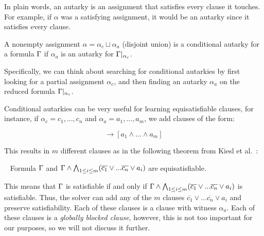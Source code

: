 In plain words, an autarky is an assignment that satisfies every clause it touches. For example, if $\alpha$ was a satisfying assignment, it would be an autarky since it satisfies every clause.

\begin{definition}
    A nonempty assignment $\alpha = \alpha_c \sqcup \alpha_a$ (disjoint union) is a conditional autarky for a formula $\Gamma$ if $\alpha_a$ is an autarky for $\Gamma|_{\alpha_c}$.
\end{definition}

Specifically, we can think about searching for conditional autarkies by first looking for a partial assignment $\alpha_c$, and then finding an autarky $\alpha_a$ on the reduced formula $\Gamma|_{\alpha_c}$.

Conditional autarkies can be very useful for learning equisatisfiable clauses, for instance, if $\alpha_c = c_1, ..., c_n$ and $\alpha_a = a_1, ..., a_m$, we add clauses of the form:

\begin{equation*}
    [c_1 \land ... \land c_n] \rightarrow [a_1 \land ... \land a_m]
\end{equation*}

This results in $m$ different clauses as in the following theorem from Kiesl et al.~\cite{conditionalautarkies}:

\begin{theorem}~\label{thm:gbcequisat}
    Formula $\Gamma$ and $\Gamma \land \bigwedge_{1 \leq i \leq m} (\overline{c_1} \lor ... \overline{c_n} \lor a_i)$ are equisatisfiable.
\end{theorem}

This means that $\Gamma$ is satisfiable if and only if $\Gamma \land \bigwedge_{1 \leq i \leq m} (\overline{c_1} \lor ... \overline{c_n} \lor a_i)$ is satisfiable. Thus, the solver can add any of the $m$ clauses $\overline{c_1} \lor ... \overline{c_n} \lor a_i$ and preserve satisfiability. Each of these clauses is a \pr clause with witness $\alpha_a$. Each of these clauses is a \emph{globally blocked clause}, however, this is not too important for our purposes, so we will not discuss it further.



